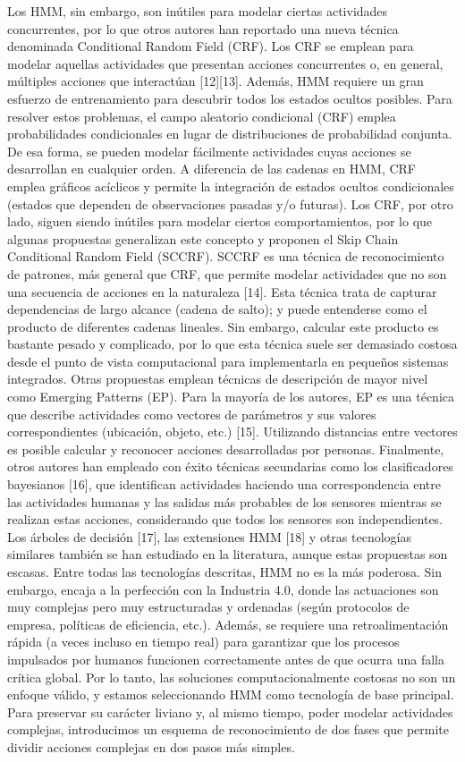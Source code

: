 \documentclass[10pt]{article}
\begin{document}
Los HMM, sin embargo, son inútiles para modelar ciertas actividades concurrentes, por lo que otros autores han reportado una nueva técnica denominada Conditional Random Field (CRF). Los CRF se emplean para modelar aquellas actividades que presentan acciones concurrentes o, en general, múltiples acciones que interactúan [12][13]. Además, HMM requiere un gran esfuerzo de entrenamiento para descubrir todos los estados ocultos posibles. Para resolver estos problemas, el campo aleatorio condicional (CRF) emplea probabilidades condicionales en lugar de distribuciones de probabilidad conjunta. De esa forma, se pueden modelar fácilmente actividades cuyas acciones se desarrollan en cualquier orden. A diferencia de las cadenas en HMM, CRF emplea gráficos acíclicos y permite la integración de estados ocultos condicionales (estados que dependen de observaciones pasadas y/o futuras). Los CRF, por otro lado, siguen siendo inútiles para modelar ciertos comportamientos, por lo que algunas propuestas generalizan este concepto y proponen el Skip Chain Conditional Random Field (SCCRF). SCCRF es una técnica de reconocimiento de patrones, más general que CRF, que permite modelar actividades que no son una secuencia de acciones en la naturaleza [14]. Esta técnica trata de capturar dependencias de largo alcance (cadena de salto); y puede entenderse como el producto de diferentes cadenas lineales. Sin embargo, calcular este producto es bastante pesado y complicado, por lo que esta técnica suele ser demasiado costosa desde el punto de vista computacional para implementarla en pequeños sistemas integrados. Otras propuestas emplean técnicas de descripción de mayor nivel como Emerging Patterns (EP). Para la mayoría de los autores, EP es una técnica que describe actividades como vectores de parámetros y sus valores correspondientes (ubicación, objeto, etc.) [15]. Utilizando distancias entre vectores es posible calcular y reconocer acciones desarrolladas por personas. Finalmente, otros autores han empleado con éxito técnicas secundarias como los clasificadores bayesianos [16], que identifican actividades haciendo una correspondencia entre las actividades humanas y las salidas más probables de los sensores mientras se realizan estas acciones, considerando que todos los sensores son independientes. Los árboles de decisión [17], las extensiones HMM [18] y otras tecnologías similares también se han estudiado en la literatura, aunque estas propuestas son escasas. Entre todas las tecnologías descritas, HMM no es la más poderosa. Sin embargo, encaja a la perfección con la Industria 4.0, donde las actuaciones son muy complejas pero muy estructuradas y ordenadas (según protocolos de empresa, políticas de eficiencia, etc.). Además, se requiere una retroalimentación rápida (a veces incluso en tiempo real) para garantizar que los procesos impulsados por humanos funcionen correctamente antes de que ocurra una falla crítica global. Por lo tanto, las soluciones computacionalmente costosas no son un enfoque válido, y estamos seleccionando HMM como tecnología de base principal. Para preservar su carácter liviano y, al mismo tiempo, poder modelar actividades complejas, introducimos un esquema de reconocimiento de dos fases que permite dividir acciones complejas en dos pasos más simples. 
\end{document}
